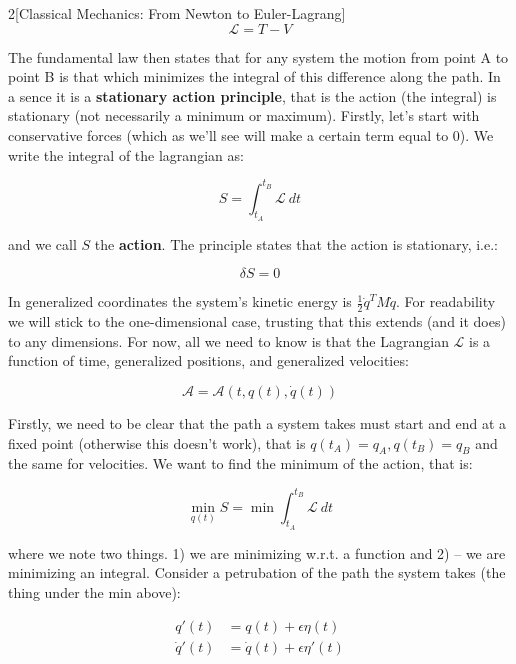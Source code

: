 \documentclass{article}
\begin{document}
\begin{multicols}{2}[Classical Mechanics: From Newton to Euler-Lagrang]
\begin{equation*}
    \mathcal{L} = T - V
\end{equation*}

The fundamental law then states that for any system the motion from point A to point B is that which minimizes the integral of this difference along the path. In a sence it is a \textbf{stationary action principle}, that is the action (the integral) is stationary (not necessarily a minimum or maximum). Firstly, let's start with conservative forces (which as we'll see will make a certain term equal to 0). We write the integral of the lagrangian as:

\begin{equation*}
    S = \int_{t_A}^{t_B} \mathcal{L}\ dt
\end{equation*}

and we call $S$ the \textbf{action}. The principle states that the action is stationary, i.e.:

\begin{equation*}
    \delta S = 0
\end{equation*}

In generalized coordinates the system's kinetic energy is $\frac{1}{2} \dot{q}^T M \dot{q}$. For readability we will stick to the one-dimensional case, trusting that this extends (and it does) to any dimensions. For now, all we need to know is that the Lagrangian $\mathcal{L}$ is a function of time, generalized positions, and generalized velocities:

\begin{equation*}
    \mathcal{A} = \mathcal{A}(t, q(t), \dot{q}(t))
\end{equation*}

Firstly, we need to be clear that the path a system takes must start and end at a fixed point (otherwise this doesn't work), that is $q(t_A) = q_A, q(t_B) = q_B$ and the same for velocities. We want to find the minimum of the action, that is:

\begin{equation*}
    \min_{q(t)} S = \min \int_{t_A}^{t_B} \mathcal{L}\ dt
\end{equation*}

where we note two things. 1) we are minimizing w.r.t. a function and 2) -- we are minimizing an integral.
Consider a petrubation of the path the system takes (the thing under the min above):

\begin{align*}
    q'(t) &= q(t) + \epsilon \eta(t) \\
    \dot{q}'(t) &= \dot{q}(t) + \epsilon \eta'(t)
\end{align*}


\end{multicols}
\end{document}
